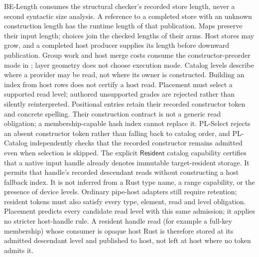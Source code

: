 BE-Length consumes the structural checker's recorded store length, never a
second syntactic size analysis. A reference to a completed store with an
unknown construction length has the runtime length of that publication.
Maps preserve their input length; choices join the checked lengths of their
arms. Host stores may grow, and a completed host producer supplies its length
before downward publication.
Group work and host merge costs consume the constructor-preorder mode in
; layer geometry does not choose execution mode.
Catalog levels describe where a provider may be read, not where its owner is
constructed. Building an index from host rows does not certify a host read.
Placement must select a supported read level; authored unsupported grades are
rejected rather than silently reinterpreted.
Positional  entries retain their recorded constructor token
and concrete spelling. Their  construction contract is
not a generic  read obligation; a membership-capable hash
index cannot replace it. PL-Select rejects an absent constructor token rather
than falling back to catalog order, and PL-Catalog independently checks that
the recorded constructor remains admitted even when selection is skipped.
The explicit \(\mathsf{Resident}\) catalog capability certifies that a native
input handle already denotes immutable target-resident storage. It permits
that handle's recorded descendant reads without constructing a host fallback
index. It is not inferred from a Rust type name, a range capability, or the
presence of device levels. Ordinary pipe-host adapters still require retention;
resident tokens must also satisfy every type, element, read and level obligation.
Placement predicts every candidate read level with this same admission; it
applies no stricter host-handle rule. A resident handle read (for example a
full-key membership) whose consumer is opaque host Rust is therefore stored at
its admitted descendant level and published to host, not left at host where
no token admits it.

